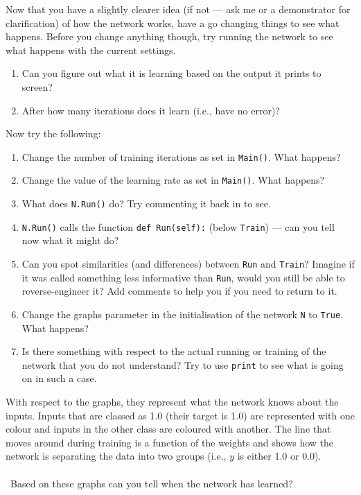 \documentclass[a4paper,10pt]{article}
\begin{document}
Now that you have a slightly clearer idea (if not --- ask me or a demonstrator for clarification) of how the network works, have a go changing things to see what happens. Before you change anything though, try running the network to see what happens with the current settings.

\begin{enumerate}
 \item Can you figure out what it is learning based on the output it prints to screen?

 \item After how many iterations does it learn (i.e., have no error)?
\end{enumerate}

Now try the following:

\begin{enumerate}
 \item Change the number of training iterations as set in \texttt{Main()}. What happens?
 \item Change the value of the learning rate as set in \texttt{Main()}. What happens?
 \item What does \texttt{N.Run()} do? Try commenting it back in to see.
 \item \texttt{N.Run()} calls the function \texttt{def Run(self):} (below \texttt{Train}) --- can you tell now what it might do?
 \item Can you spot similarities (and differences) between \texttt{Run} and \texttt{Train}? Imagine if it was called something less informative than  \texttt{Run}, would you still be able to reverse-engineer it? Add comments to help you if you need to return to it.
 \item Change the graphs parameter in the initialisation of the network \texttt{N} to \texttt{True}. What happens?
 \item Is there something with respect to the actual running or training of the network that you do not understand? Try to use \texttt{print} to see what is going on in such a case.
\end{enumerate}


With respect to the graphs, they represent what the network knows about the inputs. Inputs that are classed as 1.0 (their target is 1.0) are represented with one colour and inputs in the other class are coloured with another. The line that moves around during training is a function of the weights and shows how the network is separating the data into two groups (i.e., $y$ is either 1.0 or 0.0).
\\ \
\\ \
Based on these graphs can you tell when the network has learned?
\end{document}
